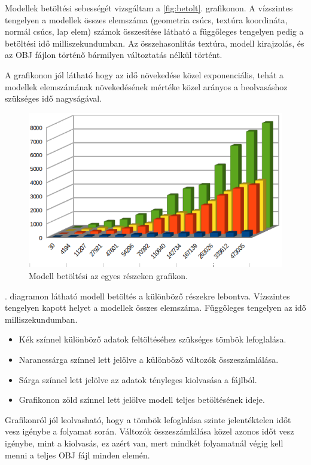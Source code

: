Modellek betöltési sebességét vizsgáltam a  \ref{fig:betolt}. grafikonon. A vízszintes tengelyen a modellek összes elemszáma (geometria csúcs, textúra koordináta, normál csúcs, lap elem) számok összesítése látható a függőleges tengelyen pedig a betöltési idő milliszekundumban. Az összehasonlítás textúra, modell kirajzolás, és az OBJ fájlon történő bármilyen változtatás nélkül történt.

A grafikonon jól látható hogy az idő növekedése közel exponenciális, tehát a modellek elemszámának növekedésének mértéke közel  arányos a beolvasáshoz szükséges idő nagyságával.
\bigskip
{}
\bigskip
\begin{figure}[h]
\centering
\includegraphics[width=\textwidth]{images/betoltesiido2.png}
\caption{Modell betöltési az egyes részeken grafikon.}
\label{fig:betolt2}
\end{figure}
\bigskip
{}. diagramon látható modell betöltés a különböző részekre lebontva. Vízszintes tengelyen kapott helyet a modellek összes elemszáma. Függőleges tengelyen az idő milliszekundumban.
\begin{itemize}
\item Kék színnel különböző adatok feltöltéséhez szükséges tömbök lefoglalása.

\item Narancssárga színnel lett jelölve a különböző változók összeszámlálása.

\item Sárga színnel lett jelölve az adatok tényleges kiolvasása a fájlból.

\item Grafikonon zöld színnel lett jelölve modell teljes betöltésének ideje.
 \end{itemize}
\bigskip
\noindent Grafikonról  jól leolvasható, hogy a tömbök lefoglalása szinte jelentéktelen időt vesz igénybe a folyamat során. Változók összeszámlálása közel azonos időt vesz igénybe, mint a kiolvasás, ez azért van, mert mindkét folyamatnál végig kell menni a teljes OBJ fájl minden elemén. 